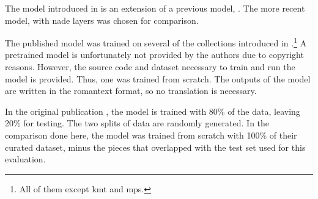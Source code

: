 
The model introduced in \textcite{micchi2021deep} is an
extension of a previous model, \textcite{micchi2020not}. The
more recent model, with \gls{nade} layers was chosen for
comparison.

The published model was trained on several of the
collections introduced in
.\footnote{All of
them except \gls{kmt} and \gls{mps}.} A pretrained model is
unfortunately not provided by the authors due to copyright
reasons. However, the source code and dataset necessary to
train and run the model is provided. Thus, one was trained
from scratch. The outputs of the model are written in the
\gls{romantext} format, so no translation is necessary. 

In the original publication \parencite{micchi2021deep}, the
model is trained with 80\% of the data, leaving 20\% for
testing. The two splits of data are randomly generated. In
the comparison done here, the model was trained from scratch
with 100\% of their curated dataset, minus the pieces that
overlapped with the test set used for this evaluation.
